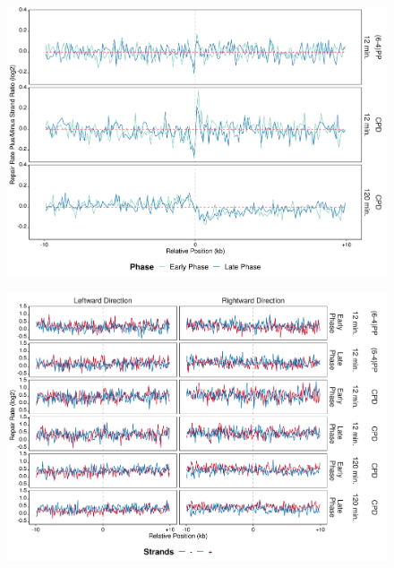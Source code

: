 \begin{figure}[H]
\begin{center}
\includegraphics[width=\textwidth]{Chapters/7_appendix/figures/supfig61}
\caption[]{}
\label{supfig:}
\end{center}
\end{figure}

\begin{figure}[H]
\begin{center}
\includegraphics[width=\textwidth]{Chapters/7_appendix/figures/supfig62}
\caption[]{}
\label{supfig:}
\end{center}
\end{figure}

